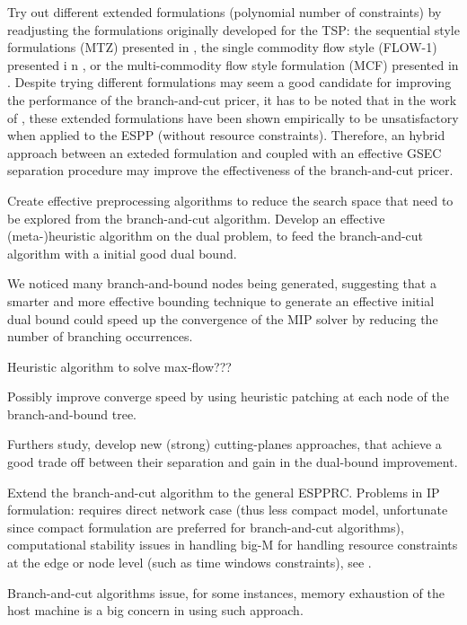 Try out different extended formulations (polynomial number of constraints)
by readjusting the formulations originally developed for the TSP:
the sequential style formulations (MTZ) presented in \textcite{miller1960},
the single commodity flow style (FLOW-1) presented i n \textcite{gavish1978travelling},
or the multi-commodity flow style formulation (MCF) presented in \textcite{wong1980integer,claus1984new}.
Despite trying different formulations may seem a good candidate for improving
the performance of the branch-and-cut pricer,
it has to be noted that in the work of \textcite{taccari2016},
these extended formulations have been shown empirically
to be unsatisfactory when applied to the ESPP (without resource constraints).
Therefore, an hybrid approach between an exteded formulation
and coupled with an effective GSEC separation procedure may improve
the effectiveness of the branch-and-cut pricer.

Create effective preprocessing algorithms to reduce the search space
that need to be explored from the branch-and-cut algorithm.
Develop an effective (meta-)heuristic algorithm on the dual problem,
to feed the branch-and-cut algorithm with a initial good dual bound.

\medskip

We noticed many branch-and-bound nodes being generated,
suggesting that a smarter and more effective bounding technique to
generate an effective initial dual bound could speed up the convergence
of the MIP solver by reducing the number of branching occurrences.

Heuristic algorithm to solve max-flow???

Possibly improve converge speed by using heuristic patching at each
node of the branch-and-bound tree.

Furthers study, develop new (strong) cutting-planes approaches,
that achieve a good trade off between their separation and gain
in the dual-bound improvement.

Extend the branch-and-cut algorithm
to the general ESPPRC.
Problems in IP formulation:
requires direct network case (thus less compact model, unfortunate since compact formulation are
preferred for branch-and-cut algorithms),
computational stability issues in handling big-M
for handling resource constraints at the edge or node level (such as time windows constraints),
see \textcite{jepsen2008branchandcut}.

Branch-and-cut algorithms issue, for some instances,
memory exhaustion of the host machine is a big concern in using such approach.

